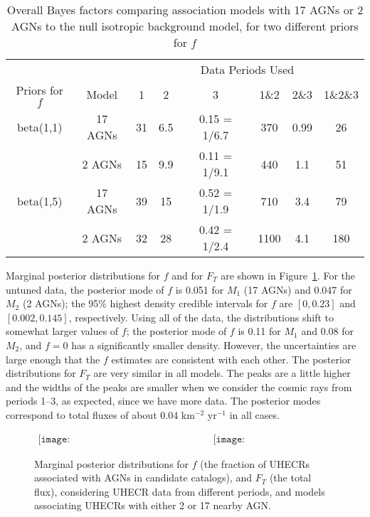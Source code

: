 \begin{table}
\begin{tabular}{|c|c|c |c| c| c| c| c|}
\hline
& & \multicolumn{6}{|c|}{Data Periods Used}\\
\cline{3-8}
 Priors for $f$ & Model & 1 &  2 &  3 &  1\&2 & 2\&3 &  1\&2\&3\\
\hline
beta(1,1) & 17 AGNs & 31 & 6.5 & 0.15 = 1/6.7 & 370 & 0.99 & 26\\
 & 2 AGNs  & 15 & 9.9 & 0.11 = 1/9.1 & 440 & 1.1 & 51\\
\hline
beta(1,5) & 17 AGNs & 39 & 15 & 0.52 = 1/1.9 & 710 & 3.4 & 79\\
 & 2 AGNs  & 32 & 28 & 0.42 = 1/2.4 & 1100 & 4.1 & 180\\
\hline
\end{tabular}
\caption{Overall Bayes factors comparing association models with 17 AGNs or
2 AGNs to the null isotropic background model, for two different priors for
$f$}\label{tab:BFtab}
\label{BFTable}
\end{table}


Marginal posterior distributions for $f$ and for $F_T$ are shown in
Figure~\ref{fig:posterior}.  For the untuned data, the posterior mode of
$f$ is 0.051 for $M_1$ (17 AGNs) and 0.047 for $M_2$ (2 AGNs);
the 95\% highest density credible intervals for $f$ are $[0, 0.23]$
and $[0.002, 0.145]$, respectively.  Using all of the data, the
distributions shift to somewhat larger values of $f$; the
posterior mode of $f$ is 0.11 for $M_1$ and 0.08 for $M_2$, and $f=0$
has a significantly smaller density.  However, the uncertainties are
large enough that the $f$ estimates are consistent with each other.  The
posterior distributions for $F_T$ are very similar in all models.  The
peaks are a little higher and the widths of the peaks are smaller when
we consider the cosmic rays from periods 1--3, as expected, since we
have more data.  The posterior modes correspond to total fluxes of about
0.04 km$^{-2}$ yr$^{-1}$ in all cases.

\begin{figure}
\centerline{$
\begin{array}{cc}
\texttt{[image: posterior\_f\_all\_margOverKappa.eps]} &
\texttt{[image: posterior\_FT\_all\_margOverKappa.eps]}
\end{array}$}
\caption{Marginal posterior distributions for $f$ (the fraction of
UHECRs associated with AGNs in candidate catalogs), and $F_T$ (the total
flux), considering UHECR data from different periods, and models
associating UHECRs with either 2 or 17 nearby AGN.}
\label{fig:posterior}
\end{figure}


